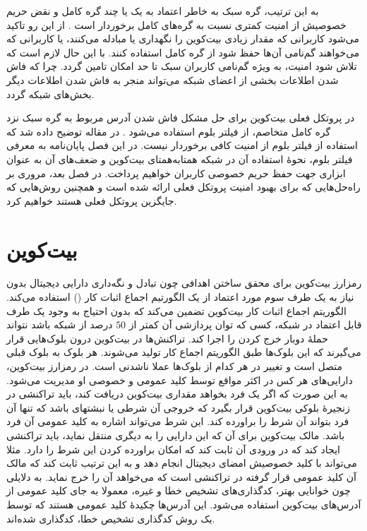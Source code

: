به این ترتیب،‌ گره سبک به خاطر اعتماد به یک یا چند گره کامل و نقض حریم خصوصیش از امنیت کمتری نسبت به گره‌های کامل برخوردار است \cite{Sompolinsky2016}. از این رو تاکید می‌شود کاربرانی که مقدار زیادی بیت‌کوین را نگهداری یا مبادله می‌کنند، یا کاربرانی که می‌خواهند گم‌نامی آن‌ها حفظ شود از گره‌ کامل استفاده کنند. با این حال لازم است که تلاش شود امنیت، به ویژه گم‌نامی کاربران سبک تا حد امکان تامین گردد. چرا که فاش شدن اطلاعات بخشی از اعضای شبکه می‌تواند منجر به فاش شدن اطلاعات دیگر بخش‌های شبکه گردد.

در پروتکل فعلی بیت‌کوین برای حل مشکل فاش شدن آدرس مربوط به گره سبک نزد گره کامل متخاصم،  از فیلتر بلوم استفاده می‌شود \cite{Hearn2013}. در مقاله \cite{Gervais2014} توضیح داده ‌شد که استفاده از فیلتر بلوم از امنیت کافی برخوردار نیست. در این فصل پایان‌نامه به معرفی فیلتر بلوم، نحوهٔ استفاده آن در شبکه همتا‌به‌همتای بیت‌کوین و ضعف‌های آن به عنوان ابزاری جهت حفظ حریم خصوصی کاربران خواهیم پرداخت. در فصل بعد، مروری بر راه‌حل‌هایی که برای بهبود امنیت پروتکل فعلی ارائه شده است و همچنین روش‌هایی که جایگزین پروتکل فعلی هستند خواهیم کرد.


\section{بیت‌کوین}

رمزارز بیت‌کوین برای محقق ساختن اهدافی چون تبادل و نگه‌داری دارایی دیجیتال بدون نیاز به یک طرف سوم مورد اعتماد از یک الگورتیم اجماع اثبات کار
()
استفاده می‌کند\cite{Nakamoto2009}. الگوریتم اجماع اثبات کار بیت‌کوین تضمین می‌کند که بدون احتیاج به  وجود یک طرف قابل اعتماد در شبکه، کسی که توان پردازشی آن کمتر از $50$ درصد از شبکه باشد نتواند حملهٔ دوبار خرج کردن
را اجرا کند. تراکنش‌ها در بیت‌کوین درون بلوک‌هایی قرار می‌گیرند که این بلوک‌ها طبق الگوریتم اجماع کار تولید می‌شوند. هر بلوک به بلوک قبلی متصل است و تغییر در هر کدام از بلوک‌ها عملا ناشدنی است. در رمزارز بیت‌کوین، دارایی‌های هر کس در اکثر مواقع توسط کلید عمومی و خصوصی او مدیریت می‌شود. به این صورت که اگر یک فرد بخواهد مقداری بیت‌کوین دریافت کند، باید تراکنشی در زنجیرهٔ بلوکی بیت‌کوین قرار بگیرد که خروجی آن شرطی یا نبشتهای باشد که تنها آن فرد بتواند آن شرط را براورده کند. این شرط می‌تواند اشاره به کلید عمومی آن فرد باشد. مالک بیت‌کوین برای آن که این دارایی را به دیگری منتقل نماید، باید تراکنشی ایجاد کند که در ورودی آن ثابت کند که امکان براورده کردن این شرط را دارد. مثلا می‌تواند با کلید خصوصیش امضای دیجیتال انجام دهد و به این ترتیب ثابت کند که مالک آن کلید عمومی قرار گرفته در تراکنشی است که می‌خواهد آن را خرج نماید. به دلایلی چون خوانایی بهتر، کدگذاری‌های تشخیص خطا و غیره، معمولا به جای کلید عمومی از آدرس‌های بیت‌کوین استفاده می‌شود. این آدرس‌ها چکیدهٔ کلید عمومی هستند که توسط یک روش کدگذاری تشخیص خطا، کدگذاری شده‌اند.


